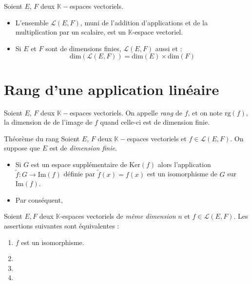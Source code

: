 \documentclass[french,11pt,twoside]{VcCours}
\begin{document}
\begin{Proposition}{} Soient $E$, $F$ deux $\mathbb{K}-$espaces vectoriels.

\begin{itemize}
\item L'ensemble $\mathcal{L}(E,F)$, muni de l'addition d'applications et de la multiplication par un scalaire, est un $\mathbb{K}$-espace vectoriel.
\item Si $E$ et $F$ sont de dimensions finies, $\mathcal{L}(E,F)$ aussi et :
$$ \textrm{dim}( \mathcal{L}(E,F)) = \textrm{dim}(E) \times \textrm{dim}(F)$$
\end{itemize}
\end{Proposition}

\section{Rang d'une application linéaire}

\begin{Definition}{} Soient $E$, $F$ deux $\mathbb{K}-$espaces vectoriels. On appelle \emph{rang} de $f$, et on note $\textrm{rg}(f)$, la dimension de de l'image de $f$ quand celle-ci est de dimension finie.
\end{Definition}

\begin{Theoreme}{Théorème du rang} Soient $E$, $F$ deux $\mathbb{K}-$espaces vectoriels et $f \in \mathcal{L}(E,F)$. On suppose que $E$ est de \emph{dimension finie}.

\begin{itemize}
\item Si $G$ est un espace supplémentaire de $\textrm{Ker}(f)$ alors l'application $\tilde{f} : G \rightarrow\textrm{Im}(f)$ définie par \newline $\tilde{f}(x)=f(x)$ est un isomorphisme de $G$ sur $\textrm{Im}(f)$.
\item Par conséquent, 
\end{itemize}
\end{Theoreme}

\begin{Theoreme}{} Soient $E, F$ deux $\mathbb{K}$-espaces vectoriels de \emph{même dimension} $n$ et $f \in \mathcal{L}(E,F)$. Les assertions suivantes sont équivalentes :

\begin{enumerate}
\item $f$ est un isomorphisme.
\item \phantom{$f$ est injective.}
\item \phantom{$f$ est surjective.}
\item \phantom{Le rang de $f$ est égal à $n$.}
\end{enumerate}
\end{Theoreme}
\end{document}
